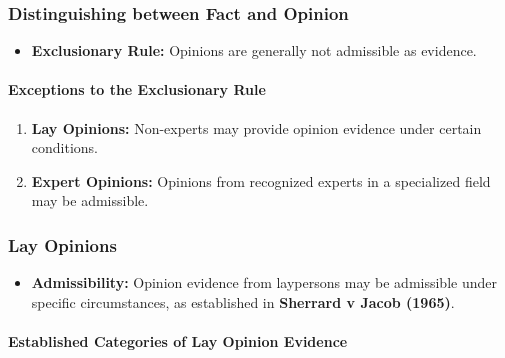\subsubsection{Distinguishing between Fact and
Opinion}\label{distinguishing-between-fact-and-opinion}

\begin{itemize}
\tightlist
\item
  \textbf{Exclusionary Rule:} Opinions are generally not admissible as
  evidence.
\end{itemize}

\paragraph{Exceptions to the Exclusionary
Rule}\label{exceptions-to-the-exclusionary-rule}

\begin{enumerate}
\def\labelenumi{\arabic{enumi}.}
\tightlist
\item
  \textbf{Lay Opinions:} Non-experts may provide opinion evidence under
  certain conditions.
\item
  \textbf{Expert Opinions:} Opinions from recognized experts in a
  specialized field may be admissible.
\end{enumerate}

\subsubsection{Lay Opinions}\label{lay-opinions}

\begin{itemize}
\tightlist
\item
  \textbf{Admissibility:} Opinion evidence from laypersons may be
  admissible under specific circumstances, as established in
  \textbf{Sherrard v Jacob (1965)}.
\end{itemize}

\paragraph{Established Categories of Lay Opinion
Evidence}\label{established-categories-of-lay-opinion-evidence}

